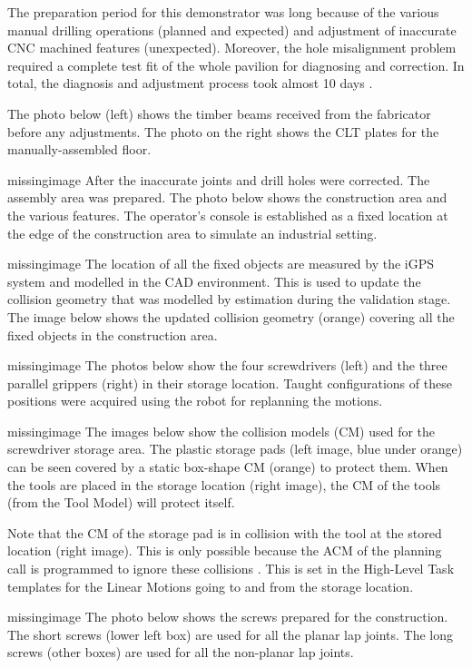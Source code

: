 The preparation period for this demonstrator was long because of the various manual drilling operations (planned and expected) and adjustment of inaccurate CNC machined features (unexpected). Moreover, the hole misalignment problem required a complete test fit of the whole pavilion for diagnosing and correction. In total, the diagnosis and adjustment process took almost 10 days . 

The photo below (left) shows the timber beams received from the fabricator before any adjustments. The photo on the right shows the CLT plates for the manually-assembled floor.

missingimage
After the inaccurate joints and drill holes were corrected. The assembly area was prepared. The photo below shows the construction area and the various features. The operator’s console is established as a fixed location at the edge of the construction area to simulate an industrial setting.

missingimage
The location of all the fixed objects are measured by the iGPS system and modelled in the CAD environment. This is used to update the collision geometry that was modelled by estimation during the validation stage. The image below shows the updated collision geometry (orange) covering all the fixed objects in the construction area. 

missingimage
The photos below show the four screwdrivers (left) and the three parallel grippers (right) in their storage location. Taught configurations of these positions were acquired using the robot for replanning the motions. 

missingimage
The images below show the collision models (CM) used for the screwdriver storage area. The plastic storage pads (left image, blue under orange) can be seen covered by a static box-shape CM (orange) to protect them. When the tools are placed in the storage location (right image), the CM of the tools (from the Tool Model) will protect itself.

Note that the CM of the storage pad is in collision with the tool at the stored location (right image). This is only possible because the ACM of the planning call is programmed to ignore these collisions . This is set in the High-Level Task templates  for the Linear Motions going to and from the storage location.

missingimage
The photo below shows the screws prepared for the construction. The short screws (lower left box) are used for all the planar lap joints. The long screws (other boxes) are used for all the non-planar lap joints.

